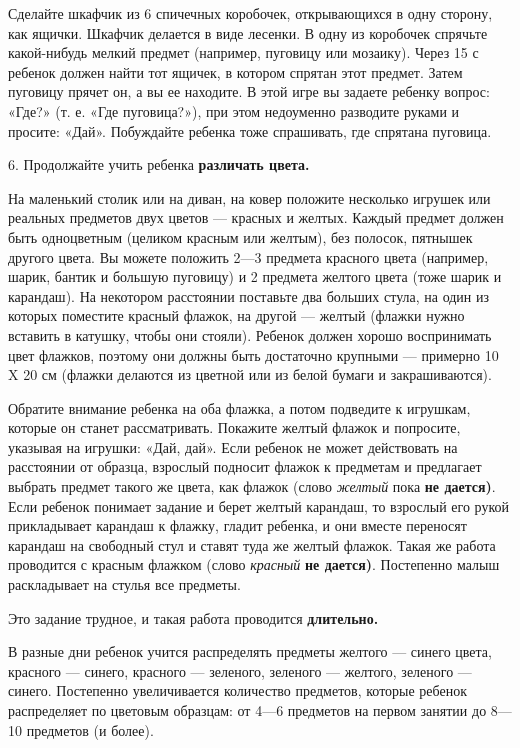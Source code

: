 \documentclass[a5paper]{book}
\renewcommand{\emph}[1]{\textit{#1}}
\begin{document}
Сделайте шкафчик из 6 спичечных коробочек, открывающихся в одну сторону,
как ящички. Шкафчик делается в виде лесенки. В одну из коробочек
спрячьте какой-нибудь мелкий предмет (например, пуговицу или мозаику).
Через 15 с ребенок должен найти тот ящичек, в котором спрятан этот
предмет. Затем пуговицу прячет он, а вы ее находите. В этой игре вы
задаете ребенку вопрос: «Где?» (т. е. «Где пуговица?»), при этом
недоуменно разводите руками и просите: «Дай». Побуждайте ребенка тоже
спрашивать, где спрятана пуговица.

6. Продолжайте учить ребенка \textbf{различать цвета.}

На маленький столик или на диван, на ковер положите несколько игрушек
или реальных предметов двух цветов --- красных и желтых. Каждый предмет
должен быть одноцветным (целиком красным или желтым), без полосок,
пятнышек другого цвета. Вы можете положить 2---3 предмета красного цвета
(например, шарик, бантик и большую пуговицу) и 2 предмета желтого цвета
(тоже шарик и карандаш). На некотором расстоянии поставьте два больших
стула, на один из которых поместите красный флажок, на другой --- желтый
(флажки нужно вставить в катушку, чтобы они стояли). Ребенок должен
хорошо воспринимать цвет флажков, поэтому они должны быть достаточно
крупными --- примерно 10 X 20 см (флажки делаются из цветной или из
белой бумаги и закрашиваются).

Обратите внимание ребенка на оба флажка, а потом подведите к игрушкам,
которые он станет рассматривать. Покажите желтый флажок и попросите,
указывая на игрушки: «Дай, дай». Если ребенок не может действовать на
расстоянии от образца, взрослый подносит флажок к предметам и предлагает
выбрать предмет такого же цвета, как флажок (слово \emph{желтый} пока
\textbf{не дается)}. Если ребенок понимает задание и берет желтый
карандаш, то взрослый его рукой прикладывает карандаш к флажку, гладит
ребенка, и они вместе переносят карандаш на свободный стул и ставят туда
же желтый флажок. Такая же работа проводится с красным флажком (слово
\emph{красный} \textbf{не дается)}. Постепенно малыш раскладывает на
стулья все предметы.

Это задание трудное, и такая работа проводится \textbf{длительно.}

В разные дни ребенок учится распределять предметы желтого --- синего
цвета, красного --- синего, красного --- зеленого, зеленого --- желтого,
зеленого --- синего. Постепенно увеличивается количество предметов,
которые ребенок распределяет по цветовым образцам: от 4---6 предметов на
первом занятии до 8---10 предметов (и более).
\end{document}
